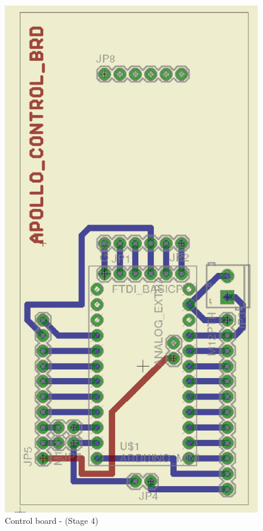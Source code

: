 \documentclass[12pt,a4paper]{report}
\begin{document}
\begin{figure}[H]
\centering
\includegraphics*[scale=0.25]{control_brd_s4}
\caption{Control board -  (Stage 4)}
\label{Control-brd-s4}
\end{figure}
\ \\
\end{document}
